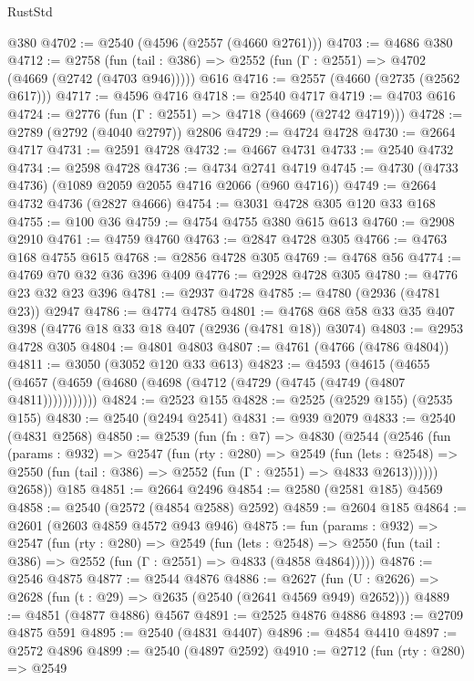 \begin{lexlean}{RustStd}
\begin{coremodule}
    @380
@4702 := @2540 (@4596 (@2557 (@4660 @2761)))
@4703 := @4686 @380
@4712 := @2758
    (fun (tail : @386) => @2552 (fun (Γ : @2551) => @4702 (@4669 (@2742 (@4703 @946)))))
    @616
@4716 := @2557 (@4660 (@2735 (@2562 @617)))
@4717 := @4596 @4716
@4718 := @2540 @4717
@4719 := @4703 @616
@4724 := @2776 (fun (Γ : @2551) => @4718 (@4669 (@2742 @4719)))
@4728 := @2789 (@2792 (@4040 @2797)) @2806
@4729 := @4724 @4728
@4730 := @2664 @4717
@4731 := @2591 @4728
@4732 := @4667 @4731
@4733 := @2540 @4732
@4734 := @2598 @4728
@4736 := @4734 @2741 @4719
@4745 := @4730 (@4733 @4736) (@1089 @2059 @2055 @4716 @2066 (@960 @4716))
@4749 := @2664 @4732 @4736 (@2827 @4666)
@4754 := @3031 @4728 @305 @120 @33 @168
@4755 := @100 @36
@4759 := @4754 @4755 @380 @615 @613
@4760 := @2908 @2910
@4761 := @4759 @4760
@4763 := @2847 @4728 @305
@4766 := @4763 @168 @4755 @615
@4768 := @2856 @4728 @305
@4769 := @4768 @56
@4774 := @4769 @70 @32 @36 @396 @409
@4776 := @2928 @4728 @305
@4780 := @4776 @23 @32 @23 @396
@4781 := @2937 @4728
@4785 := @4780 (@2936 (@4781 @23)) @2947
@4786 := @4774 @4785
@4801 := @4768 @68 @58 @33 @35 @407 @398 (@4776 @18 @33 @18 @407 (@2936 (@4781 @18)) @3074)
@4803 := @2953 @4728 @305
@4804 := @4801 @4803
@4807 := @4761 (@4766 (@4786 @4804))
@4811 := @3050 (@3052 @120 @33 @613)
@4823 := @4593
    (@4615 (@4655 (@4657 (@4659 (@4680 (@4698 (@4712 (@4729 (@4745 (@4749 (@4807 @4811)))))))))))
@4824 := @2523 @155
@4828 := @2525 (@2529 @155) (@2535 @155)
@4830 := @2540 (@2494 @2541)
@4831 := @939 @2079
@4833 := @2540 (@4831 @2568)
@4850 := @2539
    (fun (fn : @7) =>
    @4830
      (@2544
        (@2546
          (fun (params : @932) =>
          @2547
            (fun (rty : @280) =>
            @2549
              (fun (lets : @2548) =>
              @2550 (fun (tail : @386) => @2552 (fun (Γ : @2551) => @4833 @2613))))))
        @2658))
    @185
@4851 := @2664 @2496
@4854 := @2580 (@2581 @185) @4569
@4858 := @2540 (@2572 (@4854 @2588) @2592)
@4859 := @2604 @185
@4864 := @2601 (@2603 @4859 @4572 @943 @946)
@4875 := fun (params : @932) =>
  @2547
    (fun (rty : @280) =>
    @2549
      (fun (lets : @2548) =>
      @2550 (fun (tail : @386) => @2552 (fun (Γ : @2551) => @4833 (@4858 @4864)))))
@4876 := @2546 @4875
@4877 := @2544 @4876
@4886 := @2627 (fun (U : @2626) => @2628 (fun (t : @29) => @2635 (@2540 (@2641 @4569 @949) @2652)))
@4889 := @4851 (@4877 @4886) @4567
@4891 := @2525 @4876 @4886
@4893 := @2709 @4875 @591
@4895 := @2540 (@4831 @4407)
@4896 := @4854 @4410
@4897 := @2572 @4896
@4899 := @2540 (@4897 @2592)
@4910 := @2712
    (fun (rty : @280) =>
    @2549

\end{coremodule}
\end{lexlean}
